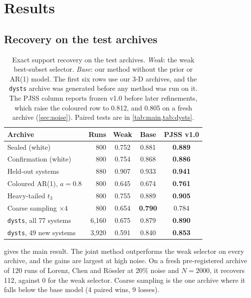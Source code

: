 \section{Results}
\label{sec:results}

\subsection{Recovery on the test archives}
\label{sec:main}
\label{sec:dysts}

\begin{table}[t]
\centering
\caption{Exact support recovery on the test archives. \emph{Weak}: the weak best-subset selector. \emph{Base}: our method without the prior or AR(1) model. The first six rows use our 3-D archives, and the \texttt{dysts} archive was generated before any method was run on it. The PJSS column reports frozen v1.0 before later refinements, which raise the coloured row to 0.812, and 0.805 on a fresh archive (\cref{sec:noise}). Paired tests are in \cref{tab:main,tab:dysts}.}
\label{tab:summary}
\small
\begin{tabular}{@{}lrccc@{}}
\toprule
Archive & Runs & Weak & Base & \textbf{PJSS v1.0} \\
\midrule
Sealed (white) & 800 & 0.752 & 0.881 & \textbf{0.889} \\
Confirmation (white) & 800 & 0.754 & 0.868 & \textbf{0.886} \\
Held-out systems & 880 & 0.907 & 0.933 & \textbf{0.941} \\
Coloured AR(1), $a=0.8$ & 800 & 0.645 & 0.674 & \textbf{0.761} \\
Heavy-tailed $t_3$ & 800 & 0.755 & 0.889 & \textbf{0.905} \\
Coarse sampling $\times4$ & 800 & 0.654 & \textbf{0.790} & 0.784 \\
\midrule
\texttt{dysts}, all 77 systems & 6{,}160 & 0.675 & 0.879 & \textbf{0.890} \\
\texttt{dysts}, 49 new systems & 3{,}920 & 0.591 & 0.840 & \textbf{0.853} \\
\bottomrule
\end{tabular}
\end{table}

 gives the main result. The joint method outperforms the weak selector on every archive, and the gains are largest at high noise. On a fresh pre-registered archive of 120 runs of Lorenz, Chen and R\"ossler at 20\% noise and $N=2000$, it recovers 112, against 0 for the weak selector. Coarse sampling is the one archive where it falls below the base model (4 paired wins, 9 losses).

